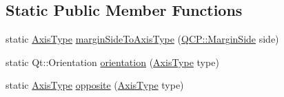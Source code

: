 \subsection*{Static Public Member Functions}
\begin{DoxyCompactItemize}
\item 
static \hyperlink{class_q_c_p_axis_ae2bcc1728b382f10f064612b368bc18a}{Axis\+Type} \hyperlink{class_q_c_p_axis_ac0a6b77bd52bec6c81cd62d167cfeba6}{margin\+Side\+To\+Axis\+Type} (\hyperlink{namespace_q_c_p_a7e487e3e2ccb62ab7771065bab7cae54}{Q\+C\+P\+::\+Margin\+Side} side)
\item 
static Qt\+::\+Orientation \hyperlink{class_q_c_p_axis_a9a68b3e45f1b1e33d4d807822342516c}{orientation} (\hyperlink{class_q_c_p_axis_ae2bcc1728b382f10f064612b368bc18a}{Axis\+Type} type)
\item 
static \hyperlink{class_q_c_p_axis_ae2bcc1728b382f10f064612b368bc18a}{Axis\+Type} \hyperlink{class_q_c_p_axis_aa85ba73dfee6483e23825461b725e363}{opposite} (\hyperlink{class_q_c_p_axis_ae2bcc1728b382f10f064612b368bc18a}{Axis\+Type} type)
\end{DoxyCompactItemize}

